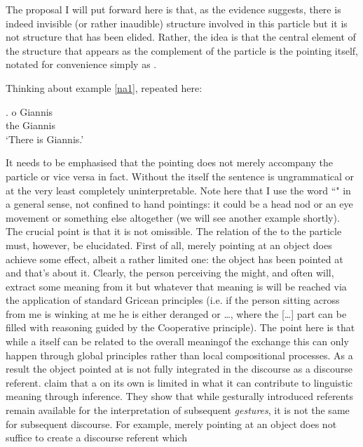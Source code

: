\documentclass[output=paper]{LSP/langsci}
\begin{document}
The proposal I will put forward here is that, as the evidence suggests, there is indeed invisible (or rather inaudible) structure involved in this particle but it is not structure that has been elided.  Rather, the idea is that the central element of the structure that appears as the complement of the particle is the pointing  itself, notated for convenience simply as \xspace\Pointinghand.   

Thinking about example \ref{na1}, repeated here:

\exg.
\na \xspace\Pointinghand o Giannis\\
\na \xspace\Pointinghand the Giannis\\
\glt `There is Giannis.'

It needs to be emphasised that the pointing  does not merely
accompany the particle or vice versa in fact. Without the 
itself the sentence is ungrammatical or at the very least completely
uninterpretable.  Note here that I use the word ``" in a general
sense, not confined to hand pointings: it could be a head nod or an
eye movement or something else altogether (we will see another example
shortly).  The crucial point is that it is not omissible. The relation
of the  to the particle must, however, be elucidated.  First of
all, merely pointing at an object does achieve some effect, albeit a
rather limited one: the object has been pointed at and that's about
it.  Clearly, the {person} perceiving the  might, and often will,
extract some meaning from it but whatever that meaning is will be
reached via the application of standard Gricean principles (i.e. if
the {person} sitting across from me is winking at me he is either
deranged or \ldots, where the [\dots] part can be filled with
reasoning guided by the Cooperative principle).  The point here is
that while a  itself can be related to the overall meaning\pagebreak[4] of
the exchange this can only happen through global  principles
rather than local compositional processes.  As a result the object
pointed at is not fully integrated in the
discourse as a discourse referent. \citet{lascarides-stone:09} claim that a  on its own
is limited in what it can contribute to linguistic meaning through
inference.  They show that while gesturally introduced referents remain
available for the interpretation of subsequent \textit{gestures}, it
is not the same for subsequent discourse. For example, merely pointing
at an object does not suffice to create a discourse referent which
\end{document}
